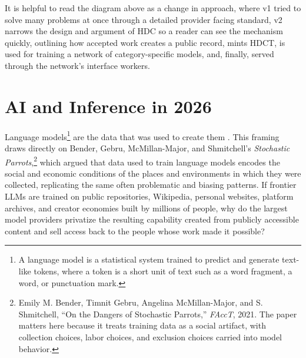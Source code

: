 \documentclass[10pt,a4paper,twocolumn]{article}
\begin{document}
\vspace{5em}
It is helpful to read the diagram above as a change in approach, where v1 tried to solve many problems at once through a detailed provider facing standard, v2 narrows the design and argument of HDC so a reader can see the mechanism quickly, outlining how accepted work creates a public record, mints HDCT, is used for training a network of category-specific models, and, finally, served through the network's interface workers.

\twocolumn
{}
\setcounter{page}{1}

\section{AI and Inference in 2026}
\label{sec:problem}

Language models\footnote{A language model is a statistical system trained to predict and generate text-like tokens, where a token is a short unit of text such as a word fragment, a word, or punctuation mark.} are the data that was used to create them \citep{bender2021parrots}. This framing draws directly on Bender, Gebru, McMillan-Major, and Shmitchell's \emph{Stochastic Parrots},\footnote{Emily M. Bender, Timnit Gebru, Angelina McMillan-Major, and S. Shmitchell, ``On the Dangers of Stochastic Parrots,'' \emph{FAccT}, 2021. The paper matters here because it treats training data as a social artifact, with collection choices, labor choices, and exclusion choices carried into model behavior.} which argued that data used to train language models encodes the social and economic conditions of the places and environments in which they were collected, replicating the same often problematic and biasing patterns. If frontier LLMs are trained on public repositories, Wikipedia, personal websites, platform archives, and creator economies built by millions of people, why do the largest model providers privatize the resulting capability created from publicly accessible content and sell access back to the people whose work made it possible?
\end{document}
